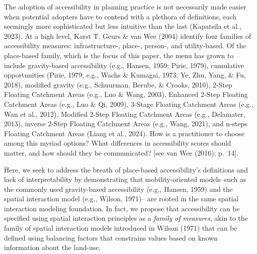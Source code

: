 \documentclass[
11pt, %
oneside, %
english, %
singlespacing, %
]{macthesis} %
\begin{document}
The adoption of accessibility in planning practice is not necessarily made easier when potential adopters have to contend with a plethora of definitions, each seemingly more sophisticated but less intuitive than the last (Kapatsila et al., 2023). At a high level, Karst T. Geurs \& van Wee (2004) identify four families of accessibility measures: infrastructure-, place-, person-, and utility-based. Of the place-based family, which is the focus of this paper, the menu has grown to include gravity-based accessibility (e.g., Hansen, 1959; Pirie, 1979), cumulative opportunities (Pirie, 1979; e.g., Wachs \& Kumagai, 1973; Ye, Zhu, Yang, \& Fu, 2018), modified gravity (e.g., Schuurman, Berube, \& Crooks, 2010), 2-Step Floating Catchment Areas (e.g., Luo \& Wang, 2003), Enhanced 2-Step Floating Catchment Areas (e.g., Luo \& Qi, 2009), 3-Stage Floating Catchment Areas (e.g., Wan et al., 2012), Modified 2-Step Floating Catchment Areas (e.g., Delamater, 2013), inverse 2-Step Floating Catchment Areas (e.g., Wang, 2021), and n-steps Floating Catchment Areas (Liang et al., 2024). How is a practitioner to choose among this myriad options? What differences in accessibility scores should matter, and how should they be communicated? {[}see van Wee (2016); p.~14{]}.

Here, we seek to address the breath of place-based accessibility's definitions and lack of interpretability by demonstrating that mobility-oriented models--such as the commonly used gravity-based accessibility (e.g., Hansen, 1959) and the spatial interaction model (e.g., Wilson, 1971)-- are rooted in the same spatial interaction modeling foundation. In fact, we propose that accessibility can be specified using spatial interaction principles as a \emph{family of measures}, akin to the family of spatial interaction models introduced in Wilson (1971) that can be defined using balancing factors that constrains values based on known information about the land-use.
\end{document}
